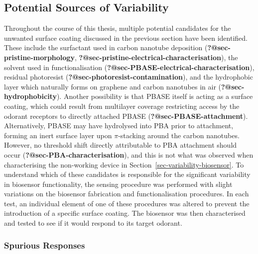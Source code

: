 \documentclass[
  a4paper,
]{scrbook}
\begin{document}
\hypertarget{sec-contamination}{%
\subsection{Potential Sources of Variability}\label{sec-contamination}}

Throughout the course of this thesis, multiple potential candidates for
the unwanted surface coating discussed in the previous section have been
identified. These include the surfactant used in carbon nanotube
deposition (\textbf{?@sec-pristine-morphology},
\textbf{?@sec-pristine-electrical-characterisation}), the solvent used
in functionalisation (\textbf{?@sec-PBASE-electrical-characterisation}),
residual photoresist (\textbf{?@sec-photoresist-contamination}), and the
hydrophobic layer which naturally forms on graphene and carbon nanotubes
in air (\textbf{?@sec-hydrophobicity}). Another possibility is that
PBASE itself is acting as a surface coating, which could result from
multilayer coverage restricting access by the odorant receptors to
directly attached PBASE (\textbf{?@sec-PBASE-attachment}).
Alternatively, PBASE may have hydrolysed into PBA prior to attachment,
forming an inert surface layer upon \(\pi\)-stacking around the carbon
nanotubes. However, no threshold shift directly attributable to PBA
attachment should occur (\textbf{?@sec-PBA-characterisation}), and this
is not what was observed when characterising the non-working device in
Section~\ref{sec-variability-biosensor}. To understand which of these
candidates is responsible for the significant variability in biosensor
functionality, the sensing procedure was performed with slight
variations on the biosensor fabrication and functionalisation
procedures. In each test, an individual element of one of these
procedures was altered to prevent the introduction of a specific surface
coating. The biosensor was then characterised and tested to see if it
would respond to its target odorant.

\hypertarget{spurious-responses}{%
\subsubsection*{Spurious Responses}\label{spurious-responses}}
\end{document}
